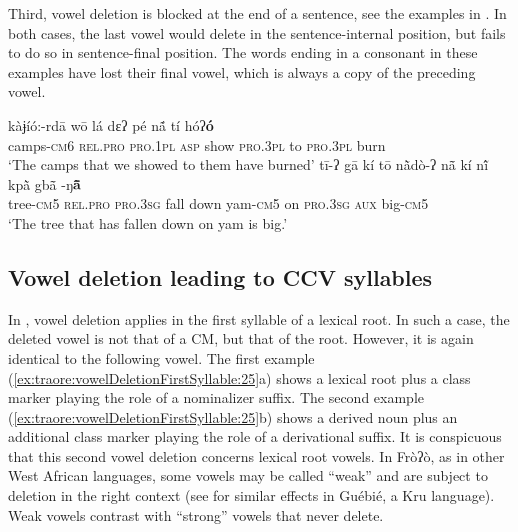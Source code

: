 \documentclass[output=paper]{langscibook}
\begin{document}
Third, vowel deletion is blocked at the end of a sentence, see the examples in . In both cases, the last vowel would delete in the sentence-internal position, but fails to do so in sentence-final position. The words ending in a consonant in these examples have lost their final vowel, which is always a copy of the preceding vowel.

\begin{exe}
    \ex \label{ex:traore:vowelDeletionBlockedAtEndOfSentence:24}
    \begin{xlist}
   \ex \gll kàɉíó:-rdā  wō  lá  dɛʔ pé  nã́  tí  hóʔ\textbf{ó}\\ 
            camps-\textsc{cm}6     \textsc{rel.pro}    \textsc{pro.1pl}    \textsc{asp} show    \textsc{pro.3pl}     to    \textsc{pro.3pl}     burn\\
         \glt    ‘The camps that we showed to them have burned’ 
    \ex \gll tī-ʔ   gā  kí  tō  nã̀dò-ʔ  nã̄  kí  nĩ́  kpã̀  gbã̄ -ŋ\textbf{ã̄ }\\
              tree-\textsc{cm}5 \textsc{rel.pro}    \textsc{pro.3sg}    {fall down}  yam-\textsc{cm}5  on    \textsc{pro.3sg}   \textsc{aux}    big-\textsc{cm}5\\
              \glt `The tree that has fallen down on yam is big.'
\end{xlist}
\end{exe}

\subsection{ Vowel deletion leading to CCV syllables}
\label{sec:traore:vowel_deletion_ccv:3b}

In , vowel deletion applies in the first syllable of a lexical root. In such a case, the deleted vowel is not that of a CM, but that of the root. However, it is again identical to the following vowel. The first example (\ref{ex:traore:vowelDeletionFirstSyllable:25}a) shows a lexical root plus a class marker playing the role of a nominalizer suffix. The second example (\ref{ex:traore:vowelDeletionFirstSyllable:25}b) shows a derived noun plus an additional class marker playing the role of a derivational suffix. It is conspicuous that this second vowel deletion concerns lexical root vowels. In Fròʔò, as in other West African languages, some vowels may be called ``weak'' and are subject to deletion in the right context (see \citealt{Sande2017} for similar effects in Guébié, a Kru language). Weak vowels contrast with ``strong'' vowels that never delete.\pagebreak
\end{document}
